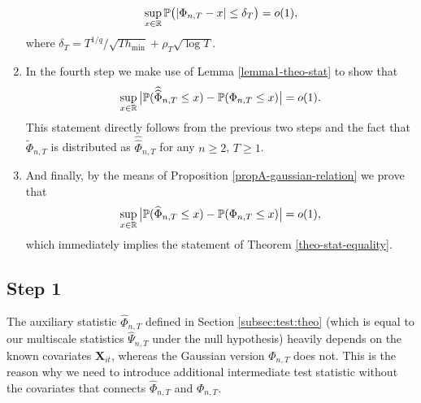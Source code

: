 \documentclass[a4paper,12pt]{article}
\newcommand{\doublehattwo}[1]{\widehat{\widehat{#1}}}
\begin{document}
\begin{enumerate}
\begin{align*}
\sup_{x \in \mathbb{R}} \mathbb{P} \big( | \Phi_{n,T} - x | \le \delta_T \big) = o(1),
\end{align*}
where $\delta_T = T^{1/q} / \sqrt{T h_{\min}} + \rho_T \sqrt{\log T}$.
\item In the fourth step we make use of Lemma \ref{lemma1-theo-stat} to show that
\begin{equation*}
\sup_{x \in \reals} \big| \pr(\doublehattwo{\Phi}_{n, T} \le x) - \pr(\Phi_{n,T} \le x) \big| = o(1). 
\end{equation*}
This statement directly follows from the previous two steps and the fact that $\widetilde{\Phi}_{n, T}$ is distributed as $\doublehattwo{\Phi}_{n, T}$ for any $n \ge 2$, $T \ge 1$.
\item And finally, by the means of Proposition \ref{propA-gaussian-relation} we prove that  
\begin{equation*}
\sup_{x \in \mathbb{R}} \big| \mathbb{P}(\widehat{\Phi}_{n, T} \le x) - \mathbb{P}(\Phi_{n,T} \le x) \big| = o(1),
\end{equation*}
which immediately implies the statement of Theorem \ref{theo-stat-equality}.
\end{enumerate}

\subsection*{Step 1}

The auxiliary statistic $\widehat{\Phi}_{n,T}$ defined in Section \ref{subsec:test:theo} (which is equal to our multiscale statistics $\widehat{\Psi}_{n,T}$ under the null hypothesis) heavily depends on the known covariates $\mathbf{X}_{it}$, whereas the Gaussian version $\Phi_{n,T}$ does not. This is the reason why we need to introduce additional intermediate test statistic without the covariates that connects $\widehat{\Phi}_{n,T}$ and $\Phi_{n,T}$. 
\end{document}
